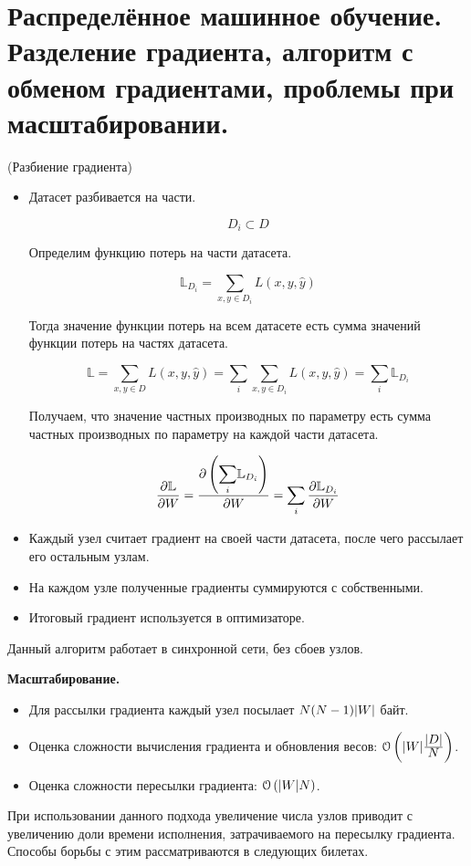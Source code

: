 \section{Распределённое машинное обучение. Разделение градиента, алгоритм с
  обменом градиентами, проблемы при масштабировании.}

\begin{algorithm}(Разбиение градиента)
  \begin{itemize}
    \item Датасет разбивается на части.

      $$D_i \subset D$$

      Определим функцию потерь на части датасета.

      $$\mathbb{L}_{D_i} = \sum_{x, y \in D_i} L(x, y, \hat{y})$$

      Тогда значение функции потерь на всем датасете есть сумма значений
      функции потерь на частях датасета.

      $$\mathbb{L} = \sum_{x, y \in D} L(x, y, \hat{y})
        = \sum_i \sum_{x, y \in D_i} L(x, y, \hat{y})
        = \sum_i \mathbb{L}_{D_i}$$

      Получаем, что значение частных производных по параметру есть сумма
      частных производных по параметру на каждой части датасета.

      $$\frac{\partial \mathbb{L}}{\partial W}
        = \frac{\partial \left( \mathlarger{\sum_i} \mathbb{L}_{D_i} \right)}
               {\partial W}
        = \sum_i \frac{\partial \mathbb{L}_{D_i}}{\partial W}$$
    \item Каждый узел считает градиент на своей части датасета, после чего
      рассылает его остальным узлам.
    \item На каждом узле полученные градиенты суммируются с собственными.
    \item Итоговый градиент используется в оптимизаторе.
  \end{itemize}
\end{algorithm}

\begin{remark} Данный алгоритм работает в синхронной сети, без сбоев узлов.
\end{remark}

\textbf{Масштабирование.}
\begin{itemize}
  \item Для рассылки градиента каждый узел посылает $N (N - 1) \lvert W\rvert$ байт.
  \item Оценка сложности вычисления градиента и обновления весов: $\mathcal{O}
    \left( \abs{W} \frac{\mathlarger{|D|}}{\mathlarger{N}} \right)$.
  \item Оценка сложности пересылки градиента: $\mathcal{O} \left( \lvert W\rvert N
    \right)$.
\end{itemize}

\begin{remark} При использовании данного подхода увеличение числа узлов приводит
  с увеличению доли времени исполнения, затрачиваемого на пересылку градиента.
  Способы борьбы с этим рассматриваются в следующих билетах.
\end{remark}
